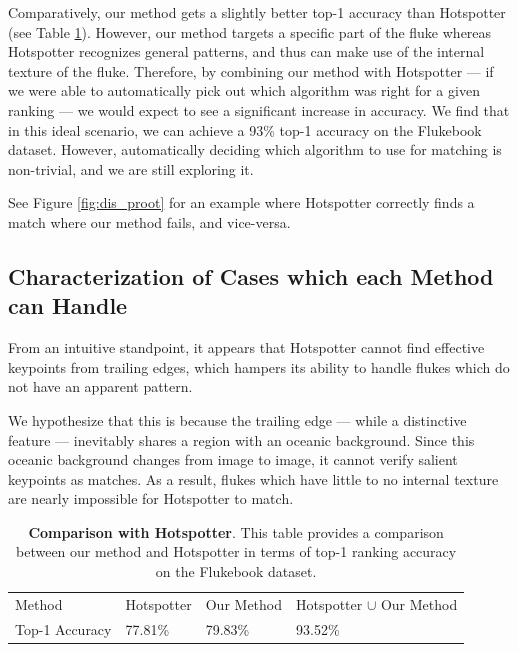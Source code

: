Comparatively, our method gets a slightly better top-1 accuracy than Hotspotter (see Table \ref{tab:vary_proot}).
However, our method targets a specific part of the fluke whereas Hotspotter recognizes general patterns, and thus can make use of the internal texture of the fluke.
Therefore, by combining our method with Hotspotter --- if we were able to automatically pick out which algorithm was right for a given ranking --- we would expect to see a significant increase in accuracy.
We find that in this ideal scenario, we can achieve a 93\% top-1 accuracy on the Flukebook dataset.
However, automatically deciding which algorithm to use for matching is non-trivial, and we are still exploring it.

See Figure \ref{fig:dis_proot} for an example where Hotspotter correctly finds a match where our method fails, and vice-versa.

\subsection{Characterization of Cases which each Method can Handle}

From an intuitive standpoint, it appears that Hotspotter cannot find effective keypoints from trailing edges, which hampers its ability to handle flukes which do not have an apparent pattern.

We hypothesize that this is because the trailing edge --- while a distinctive feature --- inevitably shares a region with an oceanic background.
Since this oceanic background changes from image to image, it cannot verify salient keypoints as matches.
As a result, flukes which have little to no internal texture are nearly impossible for Hotspotter to match.

\begin{table}[t]%
	\caption{\textbf{Comparison with Hotspotter}. This table provides a comparison between our method and Hotspotter in terms of top-1 ranking accuracy on the Flukebook dataset.}
	\centering
	\resizebox{\linewidth}{!}
	{
		\begin{tabular} {| l || l | l | l |}
		\hline
		Method & Hotspotter & Our Method & Hotspotter $\cup$ Our Method \\
		\hhline{|=#===|}
		Top-1 Accuracy  & 77.81\% & 79.83\% & 93.52\% \\
		\hline
		\end{tabular}
	}
	\label{tab:vary_proot}
\end{table}




